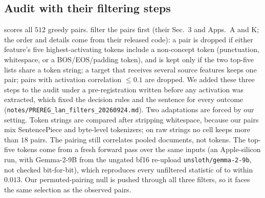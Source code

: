 \subsection{Audit with their filtering steps}\label{app:lan_filters}
 scores all $512$ greedy pairs. \citet{lan2024universal} filter the pairs first
(their Sec.~3 and Apps.~A and K; the order and details come from their released code): a pair
is dropped if either feature's five highest-activating tokens include a non-concept token
(punctuation, whitespace, or a BOS/EOS/padding token), and is kept only if the two top-five
lists share a token string; a target that receives several source features keeps one pair;
pairs with activation correlation ${\le}0.1$ are dropped. We added these three steps to the
audit under a pre-registration written before any activation was extracted, which fixed the
decision rules and the sentence for every outcome
(\texttt{notes/PREREG\_lan\_filters\_20260924.md}). Two adaptations are forced by our setting.
Token strings are compared after stripping whitespace, because our pairs mix SentencePiece and
byte-level tokenizers; on raw strings no cell keeps more than $18$ pairs. The pairing still
correlates pooled documents, not tokens. The top-five tokens come from a fresh forward pass
over the same inputs (an Apple-silicon run, with Gemma-2-9B from the
ungated bf16 re-upload \texttt{unsloth/gemma-2-9b}, not checked bit-for-bit), which reproduces every unfiltered statistic of
 to within $0.013$. Our permuted-pairing null is pushed through all three
filters, so it faces the same selection as the observed pairs.

